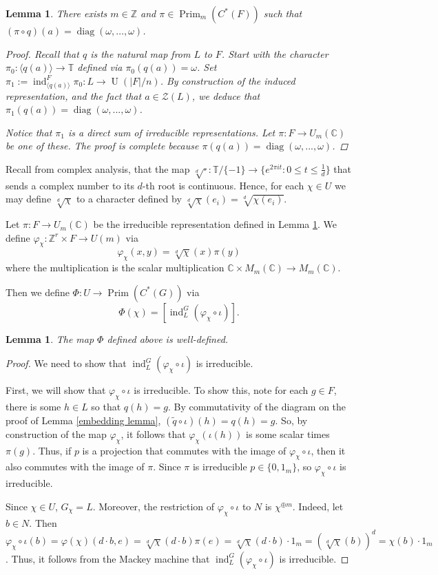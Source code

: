 \documentclass{amsart}
\newtheorem{lemma}[theorem]{Lemma}
\theoremstyle{definition}
\newcommand{\C}{\mathbb{C}}
\newcommand{\Z}{\mathbb{Z}}
\newcommand{\TT}{\mathbb{T}}
\newcommand{\ZZ}{\mathcal{Z}}
\DeclareMathOperator{\diag}{diag}
\DeclareMathOperator{\Prim}{Prim}
\DeclareMathOperator{\ind}{ind}
\DeclareMathOperator{\U}{U}
\begin{document}
\begin{lemma}\label{existance of irrep on finite group}
  There exists $m\in \Z$ and $\pi\in \Prim_m(C^*(F))$ such that $(\pi \circ q)(a)=\diag(\omega,\ldots,\omega)$.
  \begin{proof}
      Recall that $q$ is the natural map from $L$ to $F$. Start with the character $\pi_0 \colon \langle q(a)\rangle\to \TT$ defined via $\pi_0(q(a))=\omega$. Set $\pi_1:=\ind_{\langle q(a)\rangle}^F \pi_0:L\to \U(|F|/n)$. By construction of the induced representation, and the fact that $a\in \ZZ(L)$, we deduce that $\pi_1(q(a))=\diag(\omega,...,\omega)$. \par

      
      Notice that $\pi_1$ is a direct sum of irreducible representations. Let $\pi \colon F\to U_m(\C)$ be one of these. The proof is complete because $\pi(q(a))=\diag(\omega,...,\omega)$.
  \end{proof}
\end{lemma}
Recall from complex analysis, that the map $\sqrt[d]{\cdot}\colon \TT/\{-1\}\to \{e^{2\pi i t}: 0\leq t\leq \frac{1}{d}\}$ that sends a complex number to its $d$-th root is continuous. Hence, for each $\chi\in U$ we may define $\sqrt[d]\chi$ to a character defined by $\sqrt[d]{\chi}(e_i)=\sqrt[d]{\chi(e_i)}$. \par
Let $\pi \colon F\to U_m(\C)$ be the irreducible representation defined in Lemma \ref{existance of irrep on finite group}. We define $\varphi_\chi \colon \Z^r\times F\rightarrow U(m)$ via
$$\varphi_\chi(x,y)=\sqrt[d]{\chi}(x)\pi(y)$$
where the multiplication is the scalar multiplication $\C\times M_m(\C)\to M_m(\C)$.\par
Then we define $\Phi \colon U\to \Prim(C^*(G))$ via
$$\Phi(\chi)=[\ind_L^G(\varphi_\chi\circ\iota)].$$
\begin{lemma}\label{Phi is well defined}
The map $\Phi$ defined above is well-defined.
\end{lemma}
\begin{proof}
We need to show that $\ind_L^G(\varphi_\chi\circ\iota)$ is irreducible. 

First, we will show that $\varphi_\chi\circ\iota$ is irreducible. To show this, note for each $g\in F$, there is some $h\in L$ so that $q(h)=g$. By commutativity of the diagram on the proof of Lemma \ref{embedding lemma}, $(\widetilde{q}\circ \iota)(h)=q(h)=g$. So, by construction of the map $\varphi_{\chi}$, it follows that $\varphi_\chi(\iota(h))$ is some scalar times $\pi(g)$. Thus, if $p$ is a projection that commutes with the image of $\varphi_\chi\circ\iota$, then it also commutes with the image of $\pi$. Since $\pi$ is irreducible $p\in\{0,1_m\}$, so $\varphi_\chi\circ\iota$ is irreducible.

Since $\chi\in U$, $G_{\chi}=L$. Moreover, the restriction of $\varphi_\chi\circ\iota$ to $N$ is $\chi^{\oplus m}$. Indeed, let $b\in N$. Then $\varphi_{\chi}\circ \iota(b)=\varphi(\chi)(d\cdot b, e)=\sqrt[d]\chi(d\cdot b)\pi(e)=\sqrt[d]{\chi}(d\cdot b)\cdot 1_m=\left(\sqrt[d]{\chi}(b)\right)^d=\chi(b)\cdot 1_m$. Thus, it follows from the Mackey machine that $\ind_L^G(\varphi_\chi\circ\iota)$ is irreducible.
\end{proof}
\end{document}
